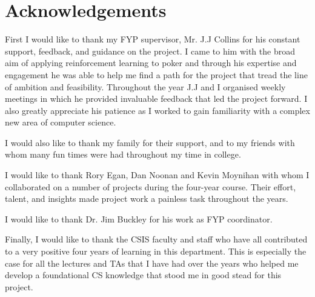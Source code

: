 
\section*{Acknowledgements}\label{sec:acknowledgements}

First I would like to thank my FYP supervisor, Mr. J.J Collins for
his constant support, feedback, and guidance on the project.
I came to him with the broad aim of applying reinforcement learning to poker and through
his expertise and engagement he was able to help me find a path for the project that
tread the line of ambition and feasibility.
Throughout the year J.J and I organised weekly meetings in which he provided invaluable
feedback that led the project forward.
I also greatly appreciate his patience as I worked to gain familiarity with a complex
new area of computer science.

I would also like to thank my family for their support,
and to my friends with whom many fun times were had throughout my time in college.

I would like to thank Rory Egan, Dan Noonan and Kevin Moynihan with whom I collaborated on a
number of projects during the four-year course.
Their effort, talent, and insights made project work a painless task throughout the years.

I would like to thank Dr. Jim Buckley for his work as FYP coordinator.

Finally, I would like to thank the CSIS faculty and staff who have all contributed
to a very positive four years of learning in this department.
This is especially the case for all the lectures and TAs that I have had over the
years who helped me develop a foundational CS knowledge that stood me in good stead for this project.